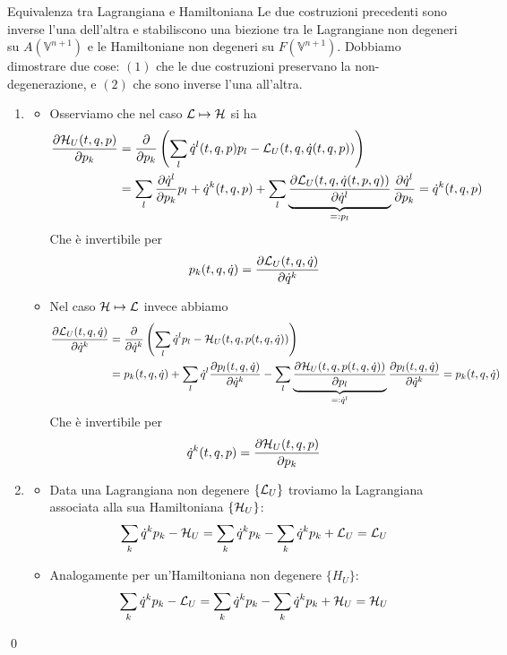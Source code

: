 \documentclass[openany]{book}
\renewcommand\V{\mathbb{V}}
\begin{document}
\begin{theorem}{Equivalenza tra Lagrangiana e Hamiltoniana}{}
    Le due costruzioni precedenti sono inverse l'una dell'altra e stabiliscono una biezione tra le Lagrangiane non degeneri su $A(\V^{n+1})$ e le Hamiltoniane non degeneri su $F(\V^{n+1})$.
    \proof 
    Dobbiamo dimostrare due cose: $(1)$ che le due costruzioni preservano la non-degenerazione, e $(2)$ che sono inverse l'una all'altra.
    \begin{enumerate}
        \item \begin{itemize}
            \item Osserviamo che nel caso $\mathcal{L}\mapsto \mathcal{H}$ si ha 
                \begin{align*}
                    \frac{\partial\mathcal{H}_U(t,q,p)}{\partial p_k} & = \frac{\partial}{\partial p_k}\left( \sum_l \dot q^l (t,q,p) p_l - \mathcal{L}_U(t,q,\dot q(t,q,p)) \right) \\
                    & = \sum_l \frac{\partial \dot q^l}{\partial p_k}p_l + \dot q^k(t,q,p) +\sum_l \underbrace{\frac{\partial \mathcal{L}_U(t,q,\dot q(t,p,q))}{\partial \dot q^l}}_{=: p_l} \frac{\partial \dot q^l}{\partial p_k} = \dot q^k(t,q,p)
                \end{align*}
                Che è invertibile per 
                \[ p_k(t,q,\dot q) = \frac{\partial \mathcal{L}_U(t,q, \dot q)}{\partial \dot q^k} \]
            \item Nel caso $\mathcal{H}\mapsto \mathcal{L}$ invece abbiamo 
                \begin{align*}
                    \frac{\partial\mathcal{L}_U(t,q,\dot q)}{\partial \dot q^k} & = \frac{\partial }{\partial \dot q^k}\left( \sum_l \dot q^l p_l - \mathcal{H}_U(t,q,p(t,q,\dot q)) \right) \\
                    & = p_k(t,q,\dot q)+ \sum_l \dot q^l\frac{\partial p_l(t,q,\dot q)}{\partial \dot q^k} - \sum_l \underbrace{\frac{\partial \mathcal{H}_U(t,q,p(t,q,\dot q))}{ \partial p_l}}_{=: \dot q^l} \frac{\partial p_l(t,q,\dot q)}{\partial \dot q^k} = p_k(t,q,\dot q)
                \end{align*}
                Che è invertibile per 
                \[ \dot q^k(t,q,p) = \frac{\partial \mathcal{H}_U(t,q,p)}{\partial p_k} \]
        \end{itemize}
        \item \begin{itemize}
            \item Data una Lagrangiana non degenere $\{\mathcal{L}_U\}$ troviamo la Lagrangiana associata alla sua Hamiltoniana $\{\mathcal{H}_U\}$:
                \[ \sum_k \dot q^k p_k -\mathcal{H}_U = \sum_k \dot q^k p_k - \sum_k \dot q^k p_k + \mathcal{L}_U = \mathcal{L}_U \]
            \item Analogamente per un'Hamiltoniana non degenere $\{H_U\}$: 
                \[ \sum_k \dot q^k p_k -\mathcal{L}_U = \sum_k \dot q^kp_k - \sum_k \dot q^k p_k + \mathcal{H}_U = \mathcal{H}_U \]
        \end{itemize}
    \end{enumerate}
    \qed 
\end{theorem}
\end{document}
